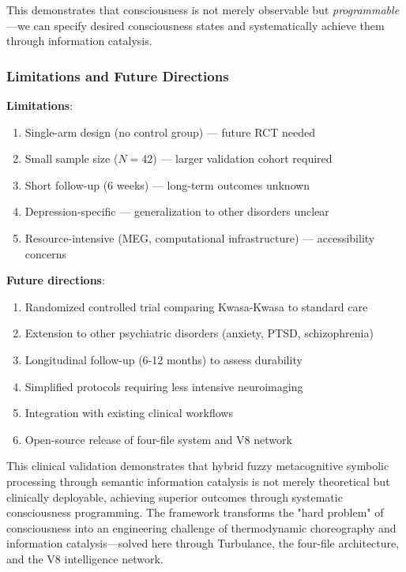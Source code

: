 This demonstrates that consciousness is not merely observable but \textit{programmable}—we can specify desired consciousness states and systematically achieve them through information catalysis.

\subsubsection{Limitations and Future Directions}

\textbf{Limitations}:
\begin{enumerate}
\item Single-arm design (no control group) — future RCT needed
\item Small sample size ($N=42$) — larger validation cohort required
\item Short follow-up (6 weeks) — long-term outcomes unknown
\item Depression-specific — generalization to other disorders unclear
\item Resource-intensive (MEG, computational infrastructure) — accessibility concerns
\end{enumerate}

\textbf{Future directions}:
\begin{enumerate}
\item Randomized controlled trial comparing Kwasa-Kwasa to standard care
\item Extension to other psychiatric disorders (anxiety, PTSD, schizophrenia)
\item Longitudinal follow-up (6-12 months) to assess durability
\item Simplified protocols requiring less intensive neuroimaging
\item Integration with existing clinical workflows
\item Open-source release of four-file system and V8 network
\end{enumerate}

This clinical validation demonstrates that hybrid fuzzy metacognitive symbolic processing through semantic information catalysis is not merely theoretical but clinically deployable, achieving superior outcomes through systematic consciousness programming. The framework transforms the "hard problem" of consciousness into an engineering challenge of thermodynamic choreography and information catalysis—solved here through Turbulance, the four-file architecture, and the V8 intelligence network.

